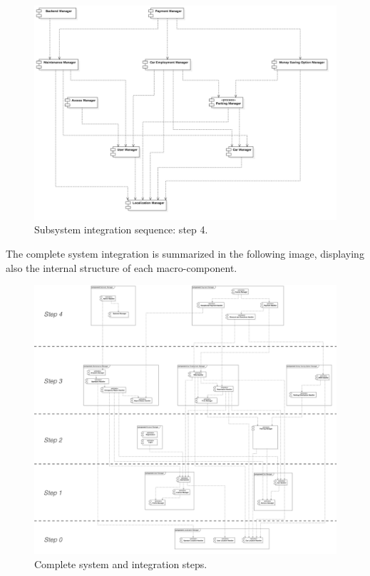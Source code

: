 			\begin{figure}[h]
				\includegraphics[width=\textwidth,center]{img/integration_strategy/steps/high_level_components_lv4.png}
				\caption{Subsystem integration sequence: step 4.}
			\end{figure}
		\FloatBarrier

			The complete system integration is summarized in the following image, displaying also the internal structure of each macro-component.
			\begin{figure}[h]
				\includegraphics[width=\textwidth,center]{img/integration_strategy/complete_unravelled-steps.png}
				\caption{Complete system and integration steps.}
			\end{figure}
		\FloatBarrier
\hphantom{spaces} %
